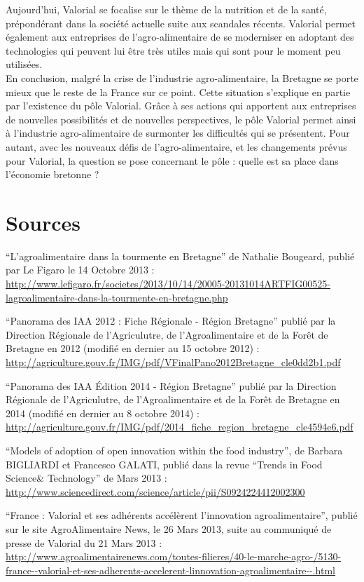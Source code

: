 \documentclass[a4paper,12pt]{report}
\begin{document}
	Aujourd’hui, Valorial se focalise sur le thème de la nutrition et de la santé, prépondérant dans la société actuelle suite aux scandales récents. Valorial permet également aux entreprises de l’agro-alimentaire de se moderniser en adoptant des technologies qui peuvent lui être très utiles mais qui sont pour le moment peu utilisées.\\

	En conclusion, malgré la crise de l’industrie agro-alimentaire, la Bretagne se porte mieux que le reste de la France sur ce point. Cette situation s’explique en partie par l’existence du pôle Valorial. Grâce à ses actions qui apportent aux entreprises de nouvelles possibilités et de nouvelles perspectives, le pôle Valorial permet ainsi à l’industrie agro-alimentaire de surmonter les difficultés qui se présentent. Pour autant, avec les nouveaux défis de l’agro-alimentaire, et les changements prévus pour Valorial, la question se pose concernant le pôle : quelle est sa place dans l’économie bretonne ?

    
\section*{Sources}
“L’agroalimentaire dans la tourmente en Bretagne” de Nathalie Bougeard, publié par Le Figaro le 14 Octobre 2013 : \url{http://www.lefigaro.fr/societes/2013/10/14/20005-20131014ARTFIG00525-lagroalimentaire-dans-la-tourmente-en-bretagne.php}

“Panorama des IAA 2012 : Fiche Régionale - Région Bretagne” publié par la Direction Régionale de l’Agriculutre, de l’Agroalimentaire et de la Forêt de Bretagne en 2012 (modifié en dernier au 15 octobre 2012) : \url{http://agriculture.gouv.fr/IMG/pdf/VFinalPano2012Bretagne_cle0dd2b1.pdf}

“Panorama des IAA Édition 2014 - Région Bretagne” publié par la Direction Régionale de l’Agriculutre, de l’Agroalimentaire et de la Forêt de Bretagne en 2014 (modifié en dernier au 8 octobre 2014) : \url{http://agriculture.gouv.fr/IMG/pdf/2014_fiche_region_bretagne_cle4594e6.pdf}

“Models of adoption of open innovation within the food industry”, de Barbara BIGLIARDI et Francesco GALATI, publié dans la revue “Trends in Food Science\& Technology” de Mars 2013 :\\ \url{http://www.sciencedirect.com/science/article/pii/S0924224412002300}

“France : Valorial et ses adhérents accélèrent l’innovation agroalimentaire”, publié sur le site AgroAlimentaire News, le 26 Mars 2013, suite au communiqué de presse de Valorial du 21 Mars 2013 : \url{http://www.agroalimentairenews.com/toutes-filieres/40-le-marche-agro-/5130-france--valorial-et-ses-adherents-accelerent-linnovation-agroalimentaire--.html}
\end{document}
